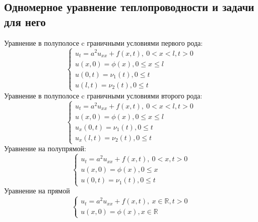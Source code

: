 \documentclass[14pt]{article}
\theoremstyle{plain}
\theoremstyle{definition}
\begin{document}
	\subsection{Одномерное уравнение теплопроводности и задачи для него}
		Уравнение в полуполосе c граничными условиями первого рода:
		\begin{equation*}
			\left\{ 
			\begin{array}{ll} 
				u_t = a^2 u_{xx} + f(x,t), \ 0 < x < l, t > 0\\
				u(x,0) = \phi(x), 0 \leq x \leq l  \\
				u(0,t) = \nu_1(t),  0 \leq t \\
				u(l,t) = \nu_2(t), 0 \leq t \end{array}\right.
		\end{equation*}
	Уравнение в полуполосе c граничными условиями второго рода:
	\begin{equation*}
		\left\{ 
		\begin{array}{ll} 
			u_t = a^2 u_{xx} + f(x,t), \ 0 < x < l, t > 0\\
			u(x,0) = \phi(x), 0 \leq x \leq l  \\
			u_x(0,t) = \nu_1(t),  0 \leq t \\
			u_x(l,t) = \nu_2(t), 0 \leq t \end{array}\right.
	\end{equation*}
	Уравнение на полупрямой:
	\begin{equation*}
	\left\{ 
	\begin{array}{ll} 
		u_t = a^2 u_{xx} + f(x,t), \ 0 < x, t > 0\\
		u(x,0) = \phi(x), 0 \leq x  \\
		u(0,t) = \nu_1(t),  0 \leq t  \end{array}\right.
\end{equation*}
	Уравнение на прямой
		\begin{equation*}
		\left\{ 
		\begin{array}{ll} 
			u_t = a^2 u_{xx} + f(x,t), \ x \in \mathbb{R}, t > 0\\
			u(x,0) = \phi(x), x \in \mathbb{R}  \end{array}\right.
	\end{equation*}
\end{document}

